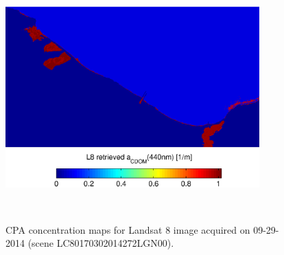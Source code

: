 \documentclass[onecolumn,3p,letterpaper]{elsarticle}
\begin{document}
\begin{figure}[htbp!]
  \begin{minipage}[c]{1.0\linewidth}
  		\centering
      \includegraphics[trim=0 0 0 30,clip,height=7cm]{./Images/CDOMmap140929_150420}  
  \end{minipage}\\

  \caption{CPA concentration maps for Landsat 8 image acquired on 09-29-2014 (scene LC80170302014272LGN00).\label{fig:CPAsMaps140929} } 
\end{figure}


\end{document}
